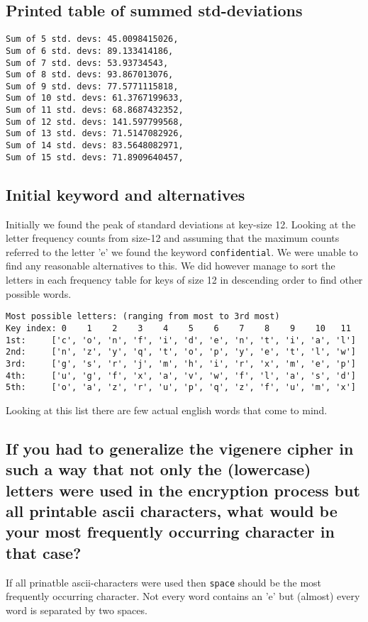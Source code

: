 \documentclass[a4paper]{article}
\begin{document}
\subsection{Printed table of summed std-deviations}
\begin{verbatim}
Sum of 5 std. devs: 45.0098415026,
Sum of 6 std. devs: 89.133414186,
Sum of 7 std. devs: 53.93734543,
Sum of 8 std. devs: 93.867013076,
Sum of 9 std. devs: 77.5771115818,
Sum of 10 std. devs: 61.3767199633,
Sum of 11 std. devs: 68.8687432352,
Sum of 12 std. devs: 141.597799568,
Sum of 13 std. devs: 71.5147082926,
Sum of 14 std. devs: 83.5648082971,
Sum of 15 std. devs: 71.8909640457,
\end{verbatim}

\subsection{Initial keyword and alternatives}
Initially we found the peak of standard deviations at key-size 12. Looking at the
letter frequency counts from size-12 and assuming that the maximum counts referred 
to the letter 'e' we found the keyword \texttt{confidential}. We were unable to
find any reasonable alternatives to this. We did however manage to sort the 
letters in each frequency table for keys of size 12 in descending order to find
other possible words. 

\begin{verbatim}
Most possible letters: (ranging from most to 3rd most)
Key index: 0    1    2    3    4    5    6    7    8    9    10   11
1st:     ['c', 'o', 'n', 'f', 'i', 'd', 'e', 'n', 't', 'i', 'a', 'l']
2nd:     ['n', 'z', 'y', 'q', 't', 'o', 'p', 'y', 'e', 't', 'l', 'w']
3rd:     ['g', 's', 'r', 'j', 'm', 'h', 'i', 'r', 'x', 'm', 'e', 'p']
4th:     ['u', 'g', 'f', 'x', 'a', 'v', 'w', 'f', 'l', 'a', 's', 'd']
5th:     ['o', 'a', 'z', 'r', 'u', 'p', 'q', 'z', 'f', 'u', 'm', 'x']
\end{verbatim}
Looking at this list there are few actual english words that come to mind. 

%
%
%

\subsection{If you had to generalize the vigenere cipher in such a way that not only the (lowercase) letters were used in the encryption process but all printable ascii characters, what would be your most frequently occurring character in that case?}
If all prinatble ascii-characters were used then \texttt{space} should be the most frequently occurring character. Not every word contains an 'e' but (almost) every word is separated by two spaces. 
\end{document}
